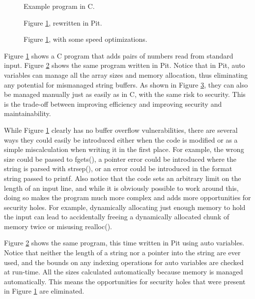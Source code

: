 \begin{figure}[htb]
	\caption{Example program in C.}
	\label{example_security.c}
\end{figure}

\begin{figure}[htb]
	\caption{Figure \ref{example_security.c}, rewritten in Pit.}
	\label{example_security.p}
\end{figure}

\begin{figure}[htb]
	\caption{Figure \ref{example_security.c}, with some speed optimizations.}
	\label{example_security2.p}
\end{figure}

Figure \ref{example_security.c} shows a C program that adds pairs of numbers read from standard input.  Figure
\ref{example_security.p} shows the same program written in Pit.  Notice that in Pit, auto variables can manage all the array sizes
and memory allocation, thus eliminating any potential for mismanaged string buffers.  As shown in Figure
\ref{example_security2.p}, they can also be managed manually just as easily as in C, with the same risk to
security.  This is the trade-off between improving efficiency and improving security and maintainability.

While Figure \ref{example_security.c} clearly has no buffer overflow vulnerabilities, there are several ways they could
easily be introduced either when the code is modified or as a simple miscalculation when writing it in the first place.
For example, the wrong size could be passed to fgets(), a pointer error could be introduced where the string is parsed
with strsep(), or an error could be introduced in the format string passed to printf.  Also notice that the code sets
an arbitrary limit on the length of an input line, and while it is obviously possible to work around this, doing so
makes the program much more complex and adds more opportunities for security holes.  For example, dynamically
allocating just enough memory to hold the input can lead to accidentally freeing a dynamically allocated chunk of
memory twice\cite{2005chen} or misusing realloc().

Figure \ref{example_security.p} shows the same program, this time written in Pit using auto variables.  Notice that neither the
length of a string nor a pointer into the string are ever used, and the bounds on any indexing operations for auto variables are
checked at run-time.  All the sizes calculated automatically because memory is managed automatically.  This means the
opportunities for security holes that were present in Figure \ref{example_security.c} are eliminated.

